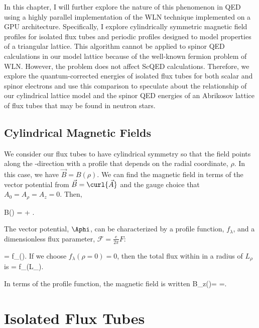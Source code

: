 In this chapter, I will further explore the nature of this 
phenomenon in \ac{QED} using
 a highly parallel implementation of the \ac{WLN} 
technique implemented on a \ac{GPU} architecture. Specifically, I explore 
cylindrically symmetric magnetic field profiles for isolated flux 
tubes and periodic profiles designed to model properties of a 
triangular lattice. This 
algorithm cannot be applied to spinor \ac{QED} calculations 
in our model lattice because 
of the well-known fermion problem of \ac{WLN}. However, the problem 
does not affect \ac{ScQED} calculations. Therefore, 
we explore the quantum-corrected energies of 
isolated flux tubes for both scalar and spinor 
electrons and use this comparison to speculate 
about the relationship of our cylindrical lattice model 
and the spinor \ac{QED} energies of an Abrikosov lattice 
of flux tubes that may be found in neutron stars.





\subsection{Cylindrical Magnetic Fields} 

We consider our flux tubes to have cylindrical symmetry so that 
the field points along the -direction with a 
profile that depends on the radial coordinate, $\rho$. 
In this case, we have $\vec{B} = B(\rho)$. 
We can find the magnetic field in terms of the vector potential 
from $\vec{B} = \curl{\vec{A}}$ and the gauge choice that $A_0 =
A_\rho = A_z = 0$. Then,

\be 
	\label{eqn:Bperiodic} B(\rho) =  +
	. 
\ee 

The vector potential, $\Aphi$, can be characterized by a profile function, 
$f_\lambda$, and a dimensionless flux parameter, $\mathcal{F}=\frac{e}{2\pi}F$:

\be 
	\Aphi = f_\lambda(\rho).
\ee 
If we choose $f_\lambda(\rho=0) = 0$, then the total flux within
in a radius of $L_\rho$ is 
\be 
	\Phi= f_\lambda(L_\rho).  
\ee 

In terms of the profile function, the magnetic field is written
\be
	\label{eqn:Bzfromfl}
	B_z(\rho)= 
		=. 
\ee 


\section{Isolated Flux Tubes}

